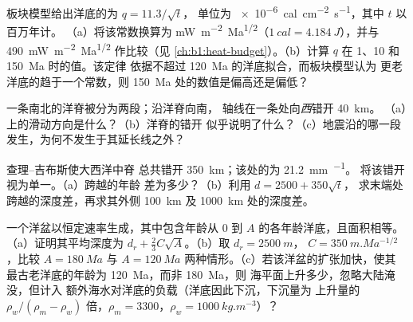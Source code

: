 \begin{exercise}[$\star\star$]\label{exo:b1:rifts-ridges-margins:7}
板块模型给出洋底的为 $q = 11.3/\sqrt t$，
单位为 \qty{e-6}{cal.cm^{-2}.s^{-1}}，其中 $t$ 以百万年计。
（a）将该常数换算为 \unit{mW.m^{-2}.Ma^{1/2}}（$\qty{1}{cal} =
\qty{4.184}{J}$），并与 \qty{490}{mW.m^{-2}.Ma^{1/2}} 作比较（见
\cref{ch:b1:heat-budget}）。（b）计算 $q$ 在 1、10 和 \qty{150}{Ma} 时的值。该定律
依据不超过 \qty{120}{Ma} 的洋底拟合，而板块模型认为
更老洋底的趋于一个常数，则
\qty{150}{Ma} 处的数值是偏高还是偏低？
\end{exercise}

\begin{exercise}[$\star\star$]\label{exo:b1:rifts-ridges-margins:8}
一条南北的洋脊被分为两段；沿洋脊向南，
轴线在一条处向\emph{西}错开 \qty{40}{km}。
（a）上的滑动方向是什么？（b）洋脊的错开
似乎说明了什么？（c）地震沿的哪一段
发生，为何不发生于其延长线之外？
\end{exercise}

\begin{exercise}[$\star\star$]\label{exo:b1:rifts-ridges-margins:9}
查理–吉布斯使大西洋中脊
总共错开 \qty{350}{km}；该处的为 \qty{21.2}{mm.^{-1}}。
将该错开视为单一。（a）跨越的年龄
差为多少？（b）利用 $d = 2500 + 350\sqrt t$，
求末端处跨越的深度差，再求其外侧
\qty{100}{km} 及 \qty{1000}{km} 处的深度差。
\end{exercise}

\begin{exercise}[$\star\star\star$]\label{exo:b1:rifts-ridges-margins:10}
一个洋盆以恒定速率生成，其中包含年龄从 0
到 $A$ 的各年龄洋底，且面积相等。（a）证明其平均深度为 $d_r +
\frac23C\sqrt A$。（b）取 $d_r = \qty{2500}{m}$，
$C = \qty{350}{m.Ma^{-1/2}}$，比较 $A = \qty{180}{Ma}$ 与
$A = \qty{120}{Ma}$ 两种情形。（c）若该洋盆的扩张加快，使其
最古老洋底的年龄为 \qty{120}{Ma}，而非 \qty{180}{Ma}，则
海平面上升多少，忽略大陆淹没，但计入
额外海水对洋底的负载（洋底因此下沉，下沉量为
上升量的 $\rho_w/(\rho_m - \rho_w)$ 倍，$\rho_m = 3300$，$\rho_w = \qty{1000}{kg.m^{-3}}$）？
\end{exercise}

